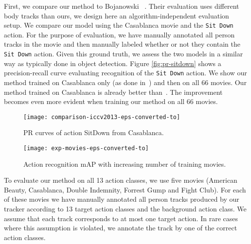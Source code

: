\documentclass[10pt,twocolumn,letterpaper]{article}
\begin{document}
First, we compare our method to Bojanowski ~\cite{bojanowski13finding}. Their evaluation uses different body tracks than ours, we design here
an algorithm-independent evaluation setup.
We compare our model using the Casablanca movie and the \texttt{Sit Down} action.
For the purpose of evaluation, we have manually annotated all person tracks in the movie and then manually labeled whether or not they contain the \texttt{Sit Down} action.
Given this ground truth, we assess the two models in a similar way as typically done in object detection.
Figure \ref{fig:pr-sitdown} shows a
precision-recall curve evaluating recognition of the \texttt{Sit Down} action. We show our method trained on Casablanca only (as done in~\cite{bojanowski13finding})
and then on all 66 movies. Our method trained on Casablanca is already better than~\cite{bojanowski13finding}. The improvement becomes even more evident when training our method on all 66 movies.


\begin{figure}

  \centering
     \texttt{[image: comparison-iccv2013-eps-converted-to]}
  \caption{\small PR curves of action SitDown from Casablanca.}
  \label{fig:pr-sitdown}

  \centering
     \texttt{[image: exp-movies-eps-converted-to]}
  \caption{\small Action recognition mAP with increasing number of training movies.}
  \label{fig:map-curve}
\vspace{-.5cm}
\end{figure}


To evaluate our method on all 13 action classes, we use five movies (American Beauty, Casablanca, Double Indemnity, Forrest Gump and Fight Club).
For each of these movies we have manually annotated all person tracks produced by our tracker according to 13 target action classes and the background action class.
We assume that each track corresponds to at most one target action.
In rare cases where this assumption is violated, we annotate the track by one of the correct action classes. 

\begin{table}[t]
\setlength{\tabcolsep}{3pt}
    \centering
    \vspace{0pt}

    \caption{Baseline comparison against winners of the LSMDC2016 movie clip retrieval challenge}
      \label{table:baseline-comparison}
      \vspace{-.5cm}
\end{table}
\end{document}

